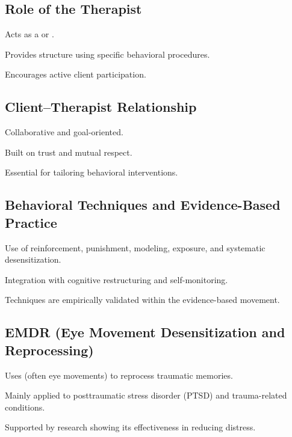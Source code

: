 \subsection{Role of the Therapist}
\begin{coloredlist}
    \item Acts as a  or .
    \item Provides structure using specific behavioral procedures.
    \item Encourages active client participation.
\end{coloredlist}

\subsection{Client–Therapist Relationship}
\begin{coloredlist}
    \item Collaborative and goal-oriented.
    \item Built on trust and mutual respect.
    \item Essential for tailoring behavioral interventions.
\end{coloredlist}

\subsection{Behavioral Techniques and Evidence-Based Practice}
\begin{coloredlist}
    \item Use of reinforcement, punishment, modeling, exposure, and systematic desensitization.
    \item Integration with cognitive restructuring and self-monitoring.
    \item Techniques are empirically validated within the evidence-based movement.
\end{coloredlist}

\subsection{EMDR (Eye Movement Desensitization and Reprocessing)}
\begin{coloredlist}
    \item Uses  (often eye movements) to reprocess traumatic memories.
    \item Mainly applied to posttraumatic stress disorder (PTSD) and trauma-related conditions.
    \item Supported by research showing its effectiveness in reducing distress.
\end{coloredlist}

